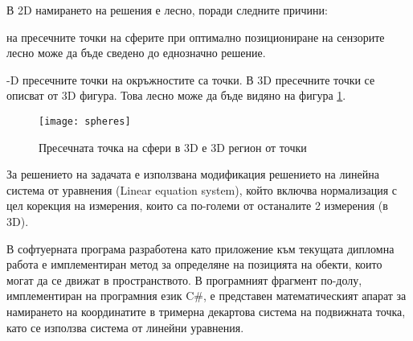 В 2D намирането на решения е лесно, поради следните причини:

\begin{enumerate}
     на пресечните точки на сферите при оптимално позициониране на сензорите лесно може да бъде сведено до еднозначно решение.

    -D пресечните точки на окръжностите са точки. В 3D пресечните точки се описват от 3D фигура. Това лесно може да бъде видяно на фигура \ref{spheres}.
\end{enumerate}
\begin{figure}
    \centerline{\texttt{[image: spheres]}}
    \caption{Пресечната точка на сфери в 3D е 3D регион от точки}
    \label{spheres}
\end{figure}

За решението на задачата е използвана модификация решението на линейна система от уравнения (Linear equation system), който включва нормализация с цел корекция на измерения, които са по-големи от останалите 2 измерения (в 3D).


В софтуерната програма разработена като приложение към текущата дипломна работа е имплементиран метод за определяне на позицията на обекти, които могат да се движат в пространството. В програмният фрагмент по-долу, имплементиран на програмния език C#, е представен математическият апарат за намирането на координатите в тримерна декартова система на подвижната точка, като се използва система от линейни уравнения. 

